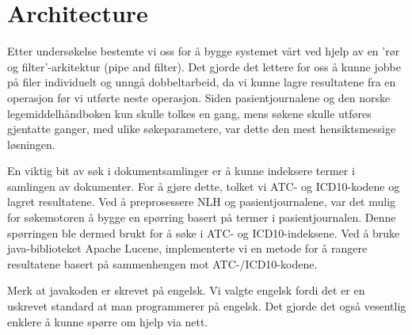 \section{Architecture}
\label{sec:architecture}

Etter undersøkelse bestemte vi oss for å bygge systemet vårt ved hjelp av en 'rør og filter'-arkitektur (pipe and filter). Det gjorde det lettere for oss å kunne jobbe på filer individuelt og unngå dobbeltarbeid, da vi kunne lagre resultatene fra en operasjon før vi utførte neste operasjon. Siden pasientjournalene og den norske legemiddelhåndboken kun skulle tolkes en gang, mens søkene skulle utføres gjentatte ganger, med ulike søkeparametere, var dette den mest hensiktsmessige løsningen.


En viktig bit av søk i dokumentsamlinger er å kunne indeksere termer i samlingen av dokumenter. For å gjøre dette, tolket vi ATC- og ICD10-kodene og lagret resultatene. Ved å preprosessere NLH og pasientjournalene, var det mulig for søkemotoren å bygge en spørring basert på termer i pasientjournalen. Denne spørringen ble dermed brukt for å søke i ATC- og ICD10-indeksene. Ved å bruke java-biblioteket Apache Lucene, implementerte vi en metode for å rangere resultatene basert på sammenhengen mot ATC-/ICD10-kodene.

Merk at javakoden er skrevet på engelsk. Vi valgte engelsk fordi det er en uskrevet standard at man programmerer på engelsk. Det gjorde det også vesentlig enklere å kunne spørre om hjelp via nett.

